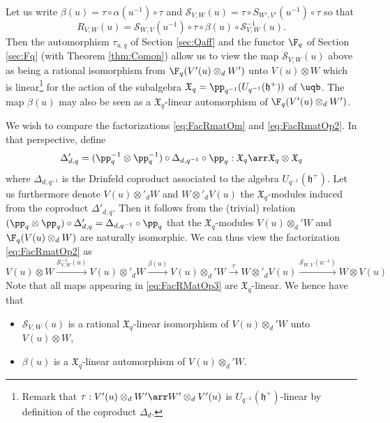 \documentclass[11pt]{amsart}
\theoremstyle{definition}
\theoremstyle{remark}
\numberwithin{equation}{section}
\begin{document}
Let us write $\beta(u) = \tau\circ \alpha(u^{-1})\circ \tau$ and $ \mathcal{S}_{V,W}(u) = \tau \circ S_{W',V'}(u^{-1})\circ \tau$ so that 
\begin{equation}\label{eq:FacRmatOp2}
R_{V,W}(u) = \mathcal{S}_{W,V}(u^{-1}) \circ \tau \circ \beta(u) \circ \mathcal{S}_{V,W}^{-1}(u).
\end{equation}
Then the automorphism $\tau_{u,q}$ of Section \ref{sec:Qaff} and the functor $\F_q$ of Section \ref{sec:Fq} (with Theorem \ref{thm:Comon}) allow us to view the map $\mathcal{S}_{V,W}(u)$ above as being a rational isomorphism from $\F_q(V'(u)\otimes_d W')$ unto $V(u)\otimes W$ which is linear\footnote{Remark that $\tau:V'(u)\otimes_d W'\arr W'\otimes_d V'(u)$ is $U_{q^{-1}}(\mathfrak{h}^+)$-linear by definition of the coproduct $\Delta_d$.} for the action of the subalgebra $\mathfrak{X}_q=\pp_{q^{-1}}(U_{q^{-1}}(\mathfrak{h}^+))$ of $\uqb$. The map $\beta(u)$ may also be seen as a $\mathfrak{X}_q$-linear automorphism of $\F_q(V'(u)\otimes_d W')$. \par
We wish to compare the factorizations \eqref{eq:FacRmatOm} and \eqref{eq:FacRmatOp2}. In that perspective, define $$\Delta_{d,q}'=(\pp_q^{-1} \otimes \pp_q^{-1})\circ \Delta_{d,q^{-1}}\circ \pp_q : \mathfrak{X}_q \arr \mathfrak{X}_q\otimes \mathfrak{X}_q$$ where $\Delta_{d,q^{-1}}$ is the Drinfeld coproduct associated to the algebra $U_{q^{-1}}(\mathfrak{h}^+)$. Let us furthermore denote $V(u)\otimes'_{d}W$ and $W\otimes'_{d}V(u)$ the $\mathfrak{X}_q$-modules induced from the coproduct $\Delta'_{d,q}$. Then it follows from the (trivial) relation $(\pp_q\otimes \pp_q)\circ \Delta_{d,q}'=\Delta_{d,q^{-1}} \circ \pp_q$ that the $\mathfrak{X}_q$-modules $V(u)\otimes_d' W$ and $\F_q(V(u)\otimes_d W)$ are naturally isomorphic. We can thus view the factorization \eqref{eq:FacRmatOp2} as 
\begin{equation}\label{eq:FacRMatOp3}
V(u)\otimes W \xrightarrow{\mathcal{S}_{V,W}^{-1}(u)} V(u)\otimes'_d W \xrightarrow{\beta(u)} V(u)\otimes_d' W \xrightarrow{\,\tau\,} W \otimes'_d V(u) \xrightarrow{\mathcal{S}_{W,V}(u^{-1})} W\otimes V(u)
\end{equation}
Note that all maps appearing in \eqref{eq:FacRMatOp3} are $\mathfrak{X}_q$-linear. We hence have that
\begin{itemize}
\item[$\bullet$] $\mathcal{S}_{V,W}(u)$ is a rational $\mathfrak{X}_q$-linear isomorphism of $V(u)\otimes_d' W$ unto $V(u)\otimes W$,
\item[$\bullet$] $\beta(u)$ is a $\mathfrak{X}_q$-linear automorphism of $V(u)\otimes_d' W$.
\end{itemize}
\end{document}
